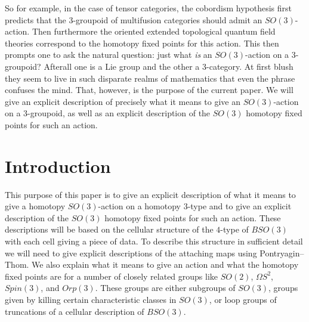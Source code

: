 \documentclass{amsart}
\begin{document}
So for example, in the case of tensor categories, the cobordism hypothesis first predicts that the 3-groupoid of multifusion categories should admit an $SO(3)$-action. Then furthermore the oriented extended topological quantum field theories correspond to the homotopy fixed points for this action. This then prompts one to ask the natural question: just what \emph{is} an $SO(3)$-action on a 3-groupoid? Afterall one is a Lie group and the other a 3-category. At first blush they seem to live in such disparate realms of mathematics that even the phrase confuses the mind.
That, however, is the purpose of the current paper. We will give an explicit description of precisely what it means to give an $SO(3)$-action on a 3-groupoid, as well as an explicit description of the $SO(3)$ homotopy fixed points for such an action.




 


\section{Introduction}

This purpose of this paper is to give an explicit description of what it means to give a homotopy $SO(3)$-action on a homotopy 3-type and to give an explicit description of the $SO(3)$ homotopy fixed points for such an action.  These descriptions will be based on the cellular structure of the $4$-type of $BSO(3)$ with each cell giving a piece of data.  To describe this structure in sufficient detail we will need to give explicit descriptions of the attaching maps using Pontryagin--Thom.  We also explain what it means to give an action and what the homotopy fixed points are for a number of closely related groups like $SO(2)$, $\Omega S^2$, $Spin(3)$, and $Orp(3)$.  These groups are either subgroups of $SO(3)$, groups given by killing certain characteristic classes in $SO(3)$, or loop groups of truncations of a cellular description of $BSO(3)$.
\end{document}
